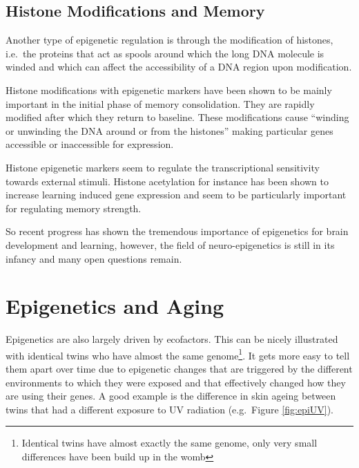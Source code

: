\documentclass[
  11pt,
]{book}
\begin{document}
\hypertarget{histone-modifications-and-memory}{%
\subsection{Histone Modifications and Memory}\label{histone-modifications-and-memory}}

Another type of epigenetic regulation is through the modification of histones, i.e.~the proteins that act as spools around which the long DNA molecule is winded and which can affect the accessibility of a DNA region upon modification.

Histone modifications with epigenetic markers have been shown to be mainly important in the initial phase of memory consolidation. They are rapidly modified after which they return to baseline. These modifications cause ``winding or unwinding the DNA around or from the histones'' making particular genes accessible or inaccessible for expression.

Histone epigenetic markers seem to regulate the transcriptional sensitivity towards external stimuli. Histone acetylation for instance has been shown to increase learning induced gene expression and seem to be particularly important for regulating memory strength.

So recent progress has shown the tremendous importance of epigenetics for brain development and learning, however, the field of neuro-epigenetics is still in its infancy and many open questions remain.

\hypertarget{epigenetics-and-aging}{%
\section{Epigenetics and Aging}\label{epigenetics-and-aging}}

Epigenetics are also largely driven by ecofactors. This can be nicely illustrated with identical twins who have almost the same genome\footnote{Identical twins have almost exactly the same genome, only very small differences have been build up in the womb}. It gets more easy to tell them apart over time due to epigenetic changes that are triggered by the different environments to which they were exposed and that effectively changed how they are using their genes. A good example is the difference in skin ageing between twins that had a different exposure to UV radiation (e.g.~Figure \ref{fig:epiUV}).
\end{document}
